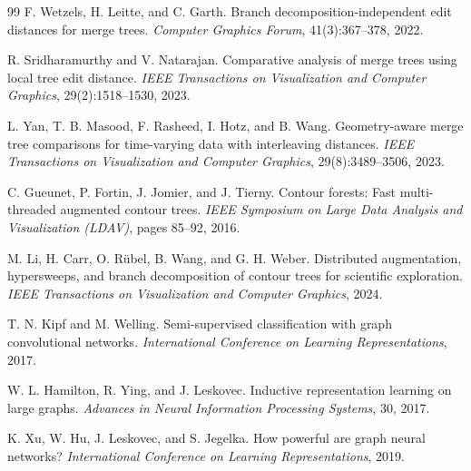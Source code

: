 \documentclass[twocolumn, a4paper, 10pt]{article}
\begin{document}
\begin{thebibliography}{99}
F. Wetzels, H. Leitte, and C. Garth.
Branch decomposition-independent edit distances for merge trees.
\textit{Computer Graphics Forum}, 41(3):367--378, 2022.

R. Sridharamurthy and V. Natarajan.
Comparative analysis of merge trees using local tree edit distance.
\textit{IEEE Transactions on Visualization and Computer Graphics}, 29(2):1518--1530, 2023.

L. Yan, T. B. Masood, F. Rasheed, I. Hotz, and B. Wang.
Geometry-aware merge tree comparisons for time-varying data with interleaving distances.
\textit{IEEE Transactions on Visualization and Computer Graphics}, 29(8):3489--3506, 2023.

C. Gueunet, P. Fortin, J. Jomier, and J. Tierny.
Contour forests: Fast multi-threaded augmented contour trees.
\textit{IEEE Symposium on Large Data Analysis and Visualization (LDAV)}, pages 85--92, 2016.

M. Li, H. Carr, O. R\"ubel, B. Wang, and G. H. Weber.
Distributed augmentation, hypersweeps, and branch decomposition of contour trees for scientific exploration.
\textit{IEEE Transactions on Visualization and Computer Graphics}, 2024.

T. N. Kipf and M. Welling.
Semi-supervised classification with graph convolutional networks.
\textit{International Conference on Learning Representations}, 2017.

W. L. Hamilton, R. Ying, and J. Leskovec.
Inductive representation learning on large graphs.
\textit{Advances in Neural Information Processing Systems}, 30, 2017.

K. Xu, W. Hu, J. Leskovec, and S. Jegelka.
How powerful are graph neural networks?
\textit{International Conference on Learning Representations}, 2019.

\end{thebibliography}
\end{document}
